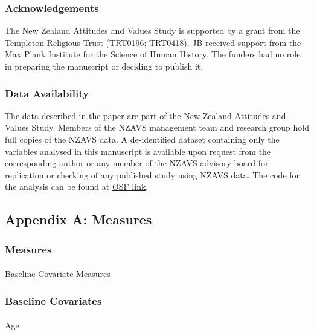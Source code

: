\documentclass[
  single column]{article}
\makeatletter
\let\oldparagraph\paragraph
\renewcommand{\paragraph}{
    \@ifstar
      \xxxParagraphStar
      \xxxParagraphNoStar
  }
\newcommand{\xxxParagraphStar}[1]{\oldparagraph*{#1}\mbox{}}
\newcommand{\xxxParagraphNoStar}[1]{\oldparagraph{#1}\mbox{}}
\makeatother
\begin{document}
\subsubsection{Acknowledgements}\label{acknowledgements}

The New Zealand Attitudes and Values Study is supported by a grant from
the Templeton Religious Trust (TRT0196; TRT0418). JB received support
from the Max Plank Institute for the Science of Human History. The
funders had no role in preparing the manuscript or deciding to publish
it.

\subsubsection{Data Availability}\label{data-availability}

The data described in the paper are part of the New Zealand Attitudes
and Values Study. Members of the NZAVS management team and research
group hold full copies of the NZAVS data. A de-identified dataset
containing only the variables analysed in this manuscript is available
upon request from the corresponding author or any member of the NZAVS
advisory board for replication or checking of any published study using
NZAVS data. The code for the analysis can be found at
\href{https://osf.io/ab7cx/}{OSF link}.

\newpage{}

\subsection{Appendix A: Measures}\label{appendix-measures}

\subsubsection{Measures}\label{measures}

\paragraph{Baseline Covariate
Measures}\label{baseline-covariate-measures}

\subsubsection{Baseline Covariates}\label{baseline-covariates}

\paragraph{Age}\label{age}
\end{document}
